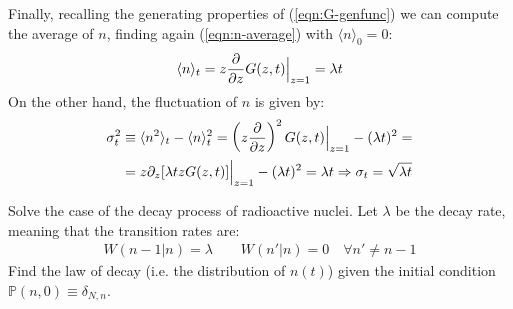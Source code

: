 \documentclass[../../main.tex]{subfiles}
\begin{document}
\begin{example}
    Finally, recalling the generating properties of (\ref{eqn:G-genfunc}) we can compute the average of $n$, finding again (\ref{eqn:n-average}) with $\langle n \rangle_0 = 0$:
    \begin{align*}
        \langle n \rangle_t = z \pdv{z} G(z,t) \Big|_{z=1} = \lambda t
    \end{align*}
    On the other hand, the fluctuation of $n$ is given by:
    \begin{align*}
        \sigma_t^2 &\equiv \langle n^2 \rangle_t - \langle n \rangle^2_t = \left(z \pdv{z}\right)^2 G(z,t)\Big|_{z=1} - (\lambda t)^2 = \\
        &= z \partial_z [\lambda t z G(z,t)]\Big|_{z=1} - (\lambda t)^2 = \lambda t \Rightarrow \sigma_t = \sqrt{\lambda t}
    \end{align*}
\end{example}

\begin{exo}
    Solve the case of the decay process of radioactive nuclei. Let $\lambda$ be the decay rate, meaning that the transition rates are:
    \begin{align*}
        W(n-1|n) = \lambda \qquad W(n'|n) = 0 \quad \forall n' \neq n-1
    \end{align*}
    Find the law of decay (i.e. the distribution of $n(t)$) given the initial condition $\mathbb{P}(n,0) \equiv \delta_{N,n}$.
\end{exo}

\end{document}
